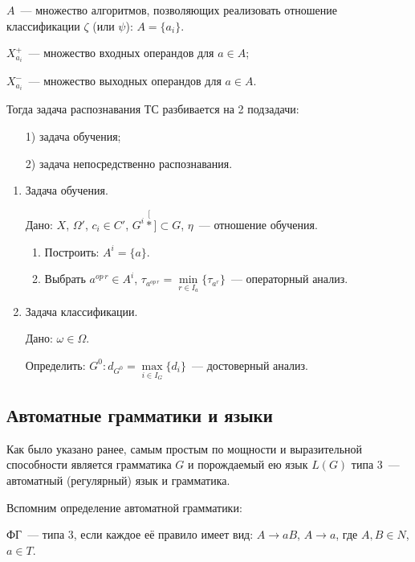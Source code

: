 $A$~--- множество алгоритмов, позволяющих реализовать отношение
классификации $\zeta$ (или $\psi$): $A = \{a_i\}$.

\noindent $X_{a_i}^+$~--- множество входных операндов для $a \in A$;

\noindent $X_{a_i}^-$~--- множество выходных операндов для $a \in A$.

Тогда задача распознавания ТС разбивается на 2 подзадачи:
\begin{enumerate}
\item[1)] задача обучения;
\item[2)] задача непосредственно распознавания.
\end{enumerate}

\begin{enumerate}
\item Задача обучения.

  Дано: $X$, $\Omega'$, $c_i \in C'$, $G^i \stackrel[*]{}{\subset} G$,
  $\eta$~--- отношение обучения.
  \begin{enumerate}
  \item Построить: $A^i = \{a\}$.
  \item Выбрать $a^{op\,r} \in A^i$, $\tau_{a^{op\,r}} = \min\limits_{r \in
      I_a} \{\tau_{a^r}\}$~--- операторный анализ.
  \end{enumerate}

\item Задача классификации.

  Дано: $\omega \in \Omega$.

  Определить: $G^0 \colon d_{G^0} = \max\limits_{i\in{}I_G}
  \{d_i\}$~--- достоверный анализ.
\end{enumerate}


\subsection{Автоматные грамматики и языки}

Как было указано ранее, самым простым по мощности и выразительной
способности является грамматика $G$ и порождаемый ею язык $L(G)$ типа
3~--- автоматный (регулярный) язык и грамматика.

\begin{rem}
Вспомним определение автоматной грамматики:

  ФГ~--- типа 3, если каждое её правило имеет вид: $A \to aB$, $A \to
  a$, где $A,B \in N$, $a \in T$.
\end{rem}

